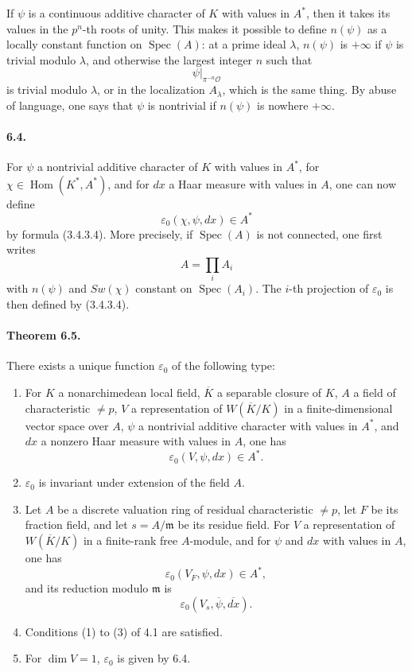 \documentclass[10pt]{article}
\newcommand{\Hom}{\operatorname{Hom}}
\newcommand{\Spec}{\operatorname{Spec}}
\providecommand{\Spec}{\operatorname{Spec}}
\providecommand{\Hom}{\operatorname{Hom}}
\providecommand{\Hom}{\operatorname{Hom}}
\providecommand{\Spec}{\operatorname{Spec}}
\providecommand{\Spec}{\operatorname{Spec}}
\providecommand{\Hom}{\operatorname{Hom}}
\begin{document}
If \(\psi\) is a continuous additive character of \(K\) with values in \(A^*\), then it takes its values in the \(p^n\)-th roots of unity. This makes it possible to define \(n(\psi)\) as a locally constant function on \(\Spec(A)\): at a prime ideal \(\lambda\), \(n(\psi)\) is \(+\infty\) if \(\psi\) is trivial modulo \(\lambda\), and otherwise the largest integer \(n\) such that
\[
\psi|_{\pi^{-n}\mathcal O}
\]
is trivial modulo \(\lambda\), or in the localization \(A_\lambda\), which is the same thing. By abuse of language, one says that \(\psi\) is nontrivial if \(n(\psi)\) is nowhere \(+\infty\).

\paragraph{6.4.} For \(\psi\) a nontrivial additive character of \(K\) with values in \(A^*\), for \(\chi\in\Hom(K^*,A^*)\), and for \(dx\) a Haar measure with values in \(A\), one can now define
\[
\varepsilon_0(\chi,\psi,dx)\in A^*
\]
by formula (3.4.3.4). More precisely, if \(\Spec(A)\) is not connected, one first writes
\[
A=\prod_i A_i
\]
with \(n(\psi)\) and \(Sw(\chi)\) constant on \(\Spec(A_i)\). The \(i\)-th projection of \(\varepsilon_0\) is then defined by (3.4.3.4).

\paragraph{Theorem 6.5.} There exists a unique function \(\varepsilon_0\) of the following type:
\begin{enumerate}[label=(\alph*)]
\item For \(K\) a nonarchimedean local field, \(\overline K\) a separable closure of \(K\), \(A\) a field of characteristic \(\ne p\), \(V\) a representation of \(W(\overline K/K)\) in a finite-dimensional vector space over \(A\), \(\psi\) a nontrivial additive character with values in \(A^*\), and \(dx\) a nonzero Haar measure with values in \(A\), one has
\[
\varepsilon_0(V,\psi,dx)\in A^*.
\]
\item \(\varepsilon_0\) is invariant under extension of the field \(A\).
\item Let \(A\) be a discrete valuation ring of residual characteristic \(\ne p\), let \(F\) be its fraction field, and let \(s=A/\mathfrak m\) be its residue field. For \(V\) a representation of \(W(\overline K/K)\) in a finite-rank free \(A\)-module, and for \(\psi\) and \(dx\) with values in \(A\), one has
\[
\varepsilon_0(V_F,\psi,dx)\in A^*,
\]
and its reduction modulo \(\mathfrak m\) is
\[
\varepsilon_0(V_s,\overline\psi,\overline{dx}).
\]
\item Conditions (1) to (3) of 4.1 are satisfied.
\item For \(\dim V=1\), \(\varepsilon_0\) is given by 6.4.
\end{enumerate}
\end{document}
